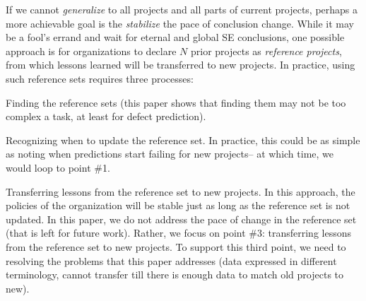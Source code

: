 If we cannot {\em generalize} to all projects and all parts
of current projects, perhaps a more achievable goal is
the {\em stabilize} the pace of conclusion change. 
While it may be 
a fool's errand  and wait for  eternal and global SE
conclusions, one possible approach is for organizations
to declare $N$ prior projects as {\em reference projects},
from which lessons learned will be transferred to new projects.
In practice, using such reference sets requires three processes:
\be
\item Finding the reference sets (this paper shows that finding
  them may not be too complex a task, at least for defect prediction).
  \item Recognizing when to update  the reference set. In practice,
  this could be as simple as noting when predictions start failing for new projects-- at which time, we would loop to point \#1.
\item Transferring
  lessons from the reference set to new projects.  
  \ee
In this approach, the policies of the organization will be
stable just as long as the reference set is not updated.
In this paper, we do not address the pace of change in the reference set
(that is left for future work).
Rather, we focus on point \#3: transferring lessons from
the reference set to new projects. To support this third point,
we need to  resolving the problems
  that this paper addresses (data expressed in different terminology,
  cannot transfer till there is enough data to match old projects to new).

  

